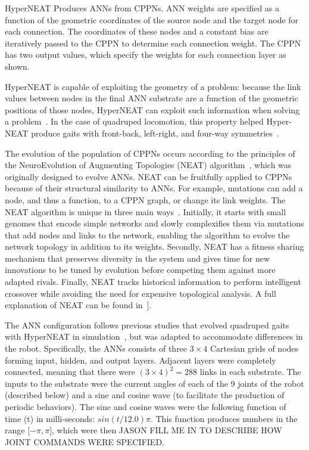\begin{itemize}
HyperNEAT Produces ANNs from CPPNs. ANN weights are specified as a function of the geometric coordinates of the source node and the target node for each connection. The coordinates of these nodes and a constant bias are iteratively passed to the CPPN to determine each connection weight. The CPPN has two output values, which specify the weights for each connection layer as shown. 

HyperNEAT is capable of exploiting the geometry of a problem: because the link values between nodes in the final ANN substrate are a function of the geometric positions of those nodes, HyperNEAT can exploit such information when solving a problem~\cite{stanley2009hypercube, clune2009sensitivity, clune2011performance}. In the case of quadruped locomotion, this property helped Hyper-NEAT produce gaits with front-back, left-right, and four-way symmetries~\cite{clune2009evolving, clune2011performance}.
  
The evolution of the population of CPPNs occurs according to the principles of the NeuroEvolution of Augmenting Topologies (NEAT) algorithm~\cite{stanley2002evolving}, which was originally designed to evolve ANNs. NEAT can be fruitfully applied to CPPNs because of their structural similarity to ANNs. For example, mutations can add a node, and thus a function, to a CPPN graph, or change its link weights. The NEAT algorithm is unique in three main ways~\cite{stanley2002evolving}. Initially, it starts with small genomes that encode simple networks and slowly complexifies them via mutations that add nodes and links to the network, enabling the algorithm to evolve the network topology in addition to its weights. Secondly, NEAT has a fitness sharing mechanism that preserves diversity in the system and gives time for new innovations to be tuned by evolution before competing them against more adapted rivals. Finally, NEAT tracks historical information to perform intelligent crossover while avoiding the need for expensive topological analysis. A full explanation of NEAT can be found in~\cite{stanley2002evolving}]. 
  
The ANN configuration follows previous studies that evolved quadruped gaits with HyperNEAT in simulation~\cite{clune2011performance, clune2009evolving}, but was adapted to accommodate differences in the robot. Specifically, the ANNs consists of three $3 \times 4$ Cartesian grids of nodes forming input, hidden, and output layers. Adjacent layers were completely connected, meaning that there were $(3 \times 4)^2= 288$ links in each substrate. The inputs to the substrate were the current angles of each of the 9 joints of the robot (described below) and a sine and cosine wave (to facilitate the production of periodic behaviors). The sine and cosine waves were the following function of time (t) in milli-seconds: $sin(t/12.0)\pi$. This function produces numbers in the range [$-\pi, \pi$], which were then JASON FILL ME IN TO DESCRIBE HOW JOINT COMMANDS WERE SPECIFIED. 


\end{itemize}
